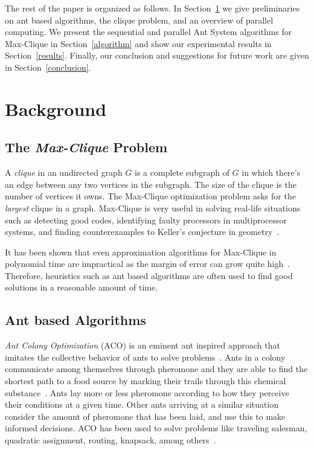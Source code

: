 \documentclass[11pt]{article}
\begin{document}
The rest of the paper is organized as follows. In Section~\ref{background} we give preliminaries on ant based algorithms, the clique problem, and an overview of parallel computing.  We present the sequential and parallel Ant System algorithms for Max-Clique in Section~\ref{algorithm} and show our experimental results in Section~\ref{results}.  Finally, our conclusion and suggestions for future work are given in Section~\ref{conclusion}.


\section{Background}\label{background} 
\subsection{The \textit{Max-Clique} Problem}

A \textit{clique} in an undirected graph $G$ is a complete subgraph of $G$ in which there's an edge between any two vertices in the subgraph.  The size of the clique is the number of vertices it owns. The  Max-Clique optimization problem asks for the \textit{largest} clique in a graph.  Max-Clique is very useful in solving real-life situations such as detecting good codes, identifying faulty processors in multiprocessor systems, and finding counterexamples to Keller's conjecture in geometry~\cite{BP2}\cite{Sloane}\cite{SMW}\cite{Keller}\cite{LS}.

It has been shown that even approximation algorithms for Max-Clique in polynomial time are impractical as the margin of error can grow quite high~\cite{Hastad}. Therefore, heuristics such as ant based algorithms are often used to find good solutions in a reasonable amount of time.

\subsection{Ant based Algorithms}\label{max_clique} 


\textit{Ant Colony Optimization} (ACO) is an eminent ant inspired approach that imitates the collective behavior of ants to solve problems~\cite{DD}. Ants in a colony communicate among themselves through pheromone and they are able to find the shortest path to a food source by marking their trails through this chemical substance~\cite{BDT}. Ants lay more or less pheromone according to how they perceive their conditions at a given time. Other ants arriving at a similar situation consider the amount of pheromone that has been laid, and use this to make informed decisions. ACO has been used to solve problems like traveling salesman, quadratic assignment, routing, knapsack, among others~\cite{DG, TAIL, MC}.
\end{document}
